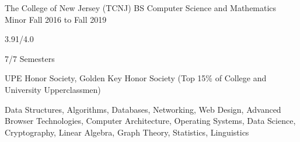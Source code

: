 
\begin{cventry}
    {The College of New Jersey (TCNJ)}
    {BS Computer Science and Mathematics Minor}
    {Fall 2016 to Fall 2019}{}{}
    \begin{cvitems}
        \item{} 3.91/4.0
        \item{} 7/7 Semesters
        \item{} UPE Honor Society, Golden Key Honor Society (Top 15\% of College and University Upperclassmen)
        \item{} Data Structures, Algorithms, Databases, Networking, Web Design, Advanced Browser Technologies, Computer Architecture, Operating Systems, Data Science, Cryptography, Linear Algebra, Graph Theory, Statistics, Linguistics
    \end{cvitems}
\end{cventry}
